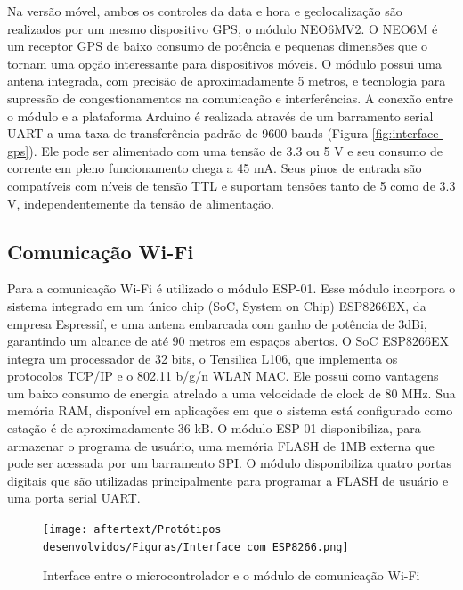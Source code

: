Na versão móvel, ambos os controles da data e hora e geolocalização são realizados por um mesmo dispositivo GPS, o módulo NEO6MV2. O NEO6M é um receptor GPS de baixo consumo de potência e pequenas dimensões que o tornam uma opção interessante para dispositivos móveis. O módulo possui uma antena integrada, com precisão de aproximadamente 5 metros, e tecnologia para supressão de congestionamentos na comunicação e interferências. A conexão entre o módulo e a plataforma Arduino é realizada através de um barramento serial UART a uma taxa de transferência padrão de 9600 bauds (Figura \ref{fig:interface-gps}). Ele pode ser alimentado com uma tensão de 3.3 ou 5 V e seu consumo de corrente em pleno funcionamento chega a 45 mA. Seus pinos de entrada são compatíveis com níveis de tensão TTL e suportam tensões tanto de 5 como de 3.3 V, independentemente da tensão de alimentação.

\subsection{Comunicação Wi-Fi}
Para a comunicação Wi-Fi é utilizado o módulo ESP-01. Esse módulo incorpora o sistema integrado em um único chip (SoC, System on Chip) ESP8266EX, da empresa Espressif, e uma antena embarcada com ganho de potência de 3dBi, garantindo um alcance de até 90 metros em espaços abertos. O SoC ESP8266EX integra um processador de 32 bits, o Tensilica L106, que implementa os protocolos TCP/IP e o 802.11 b/g/n WLAN MAC. Ele possui como vantagens um baixo consumo de energia atrelado a uma velocidade de clock de 80 MHz. Sua memória RAM, disponível em aplicações em que o sistema está configurado como estação é de aproximadamente 36 kB. O módulo ESP-01 disponibiliza, para armazenar o programa de usuário, uma memória FLASH de 1MB externa que pode ser acessada por um barramento SPI. O módulo disponibiliza quatro portas digitais que são utilizadas principalmente para programar a FLASH de usuário e uma porta serial UART.

\begin{figure}[h]
    \centering
    \texttt{[image: aftertext/Protótipos desenvolvidos/Figuras/Interface com ESP8266.png]}
    \caption{Interface entre o microcontrolador e o módulo de comunicação Wi-Fi}
    \label{fig:interface-esp}
\end{figure}

